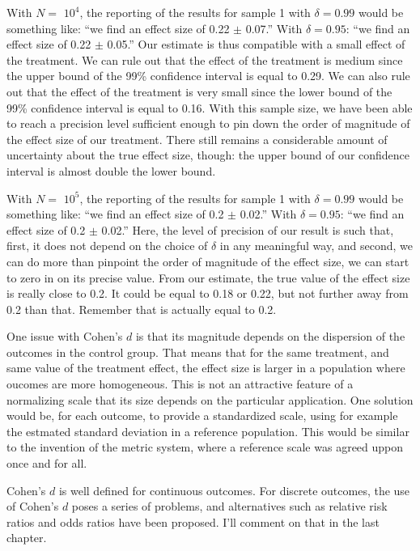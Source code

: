 \documentclass[]{book}
\theoremstyle{definition}
\theoremstyle{definition}
\theoremstyle{definition}
\theoremstyle{remark}
\let\BeginKnitrBlock\begin \let\EndKnitrBlock\end
\begin{document}
With \(N=\) \ensuremath{10^{4}}, the reporting of the results for sample 1 with \(\delta=0.99\) would be something like: ``we find an effect size of 0.22 \(\pm\) 0.07.''
With \(\delta=0.95\): ``we find an effect size of 0.22 \(\pm\) 0.05.''
Our estimate is thus compatible with a small effect of the treatment.
We can rule out that the effect of the treatment is medium since the upper bound of the 99\% confidence interval is equal to 0.29.
We can also rule out that the effect of the treatment is very small since the lower bound of the 99\% confidence interval is equal to 0.16.
With this sample size, we have been able to reach a precision level sufficient enough to pin down the order of magnitude of the effect size of our treatment.
There still remains a considerable amount of uncertainty about the true effect size, though: the upper bound of our confidence interval is almost double the lower bound.

With \(N=\) \ensuremath{10^{5}}, the reporting of the results for sample 1 with \(\delta=0.99\) would be something like: ``we find an effect size of 0.2 \(\pm\) 0.02.''
With \(\delta=0.95\): ``we find an effect size of 0.2 \(\pm\) 0.02.''
Here, the level of precision of our result is such that, first, it does not depend on the choice of \(\delta\) in any meaningful way, and second, we can do more than pinpoint the order of magnitude of the effect size, we can start to zero in on its precise value.
From our estimate, the true value of the effect size is really close to 0.2.
It could be equal to 0.18 or 0.22, but not further away from 0.2 than that.
Remember that is actually equal to 0.2.

\BeginKnitrBlock{remark}
\iffalse{} {Remark. } \fi{}One issue with Cohen's \(d\) is that its magnitude depends on the dispersion of the outcomes in the control group.
That means that for the same treatment, and same value of the treatment effect, the effect size is larger in a population where oucomes are more homogeneous.
This is not an attractive feature of a normalizing scale that its size depends on the particular application.
One solution would be, for each outcome, to provide a standardized scale, using for example the estmated standard deviation in a reference population.
This would be similar to the invention of the metric system, where a reference scale was agreed uppon once and for all.
\EndKnitrBlock{remark}

\BeginKnitrBlock{remark}
\iffalse{} {Remark. } \fi{}Cohen's \(d\) is well defined for continuous outcomes.
For discrete outcomes, the use of Cohen's \(d\) poses a series of problems, and alternatives such as relative risk ratios and odds ratios have been proposed.
I'll comment on that in the last chapter.
\EndKnitrBlock{remark}
\end{document}

